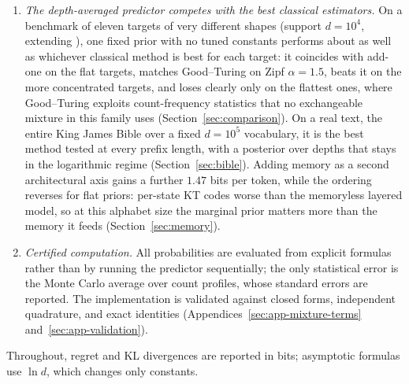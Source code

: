 \documentclass[11pt]{article}
\newcommand{\cstar}{c^{\star}}
\begin{document}
\begin{enumerate}
  minimum of exactly one at the freezing transition \(\cstar\) of the
  prior---the depth beyond which a typical draw concentrates its mass on a
  few symbols---which is also why the transition leaves no kink in the
  regret.  The data exponent \(1-1/\alpha\) is thus the rate at which new
  symbols are discovered.
\item \emph{The depth-averaged predictor competes with the best classical
  estimators.}  On a benchmark of eleven targets of very different shapes
  (support \(d=10^4\), extending \cite{orlitsky2015competitive}), one
  fixed prior with no tuned constants performs about as well as whichever
  classical method is best for each target: it coincides with add-one on
  the flat targets, matches Good--Turing on Zipf \(\alpha=1.5\), beats it
  on the more concentrated targets, and loses clearly only on the flattest
  ones, where Good--Turing exploits count-frequency statistics that no
  exchangeable mixture in this family uses
  (Section~\ref{sec:comparison}).  On a real text, the entire King James
  Bible over a fixed \(d=10^5\) vocabulary, it is the best method tested
  at every prefix length, with a posterior over depths that stays in the
  logarithmic regime (Section~\ref{sec:bible}).  Adding memory as a second
  architectural axis gains a further \(1.47\) bits per token, while the ordering reverses for flat priors: per-state KT codes worse than the memoryless layered
  model, so at this alphabet size the marginal prior matters more than the
  memory it feeds (Section~\ref{sec:memory}).
\item \emph{Certified computation.} All probabilities are evaluated from
explicit formulas rather than by running the predictor sequentially;
the only statistical error is the Monte Carlo average over count
profiles, whose standard errors are reported. The implementation is
validated against closed forms, independent quadrature, and exact
identities (Appendices~\ref{sec:app-mixture-terms}
and~\ref{sec:app-validation}).
\end{enumerate}
Throughout, regret and KL divergences are reported in bits; asymptotic
formulas use \(\ln d\), which changes only constants.
\end{document}
